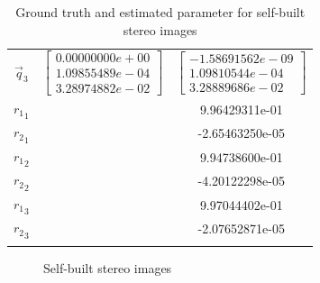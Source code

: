 \begin{table}[htbp]
\begin{tabular}{ccc}
		$\vec{q}_3$ & $ \begin{bmatrix} 0.00000000e+00\\
		1.09855489e-04 \\
		3.28974882e-02 \end{bmatrix}$ & $\begin{bmatrix} -1.58691562e-09\\
		1.09810544e-04 \\
		3.28889686e-02 \end{bmatrix}$ \\
		${r_1}_1$ & &9.96429311e-01\\
		\addlinespace[5pt]
		${r_2}_1$& &  -2.65463250e-05\\
		\addlinespace[5pt]
		${r_1}_2$ & &9.94738600e-01\\
		\addlinespace[5pt]
		${r_2}_2$& & -4.20122298e-05\\
		\addlinespace[5pt]
		${r_1}_3$ & &9.97044402e-01\\
		\addlinespace[5pt]
		${r_2}_3$& & -2.07652871e-05\\
		\addlinespace[5pt]
		\bottomrule
	\end{tabular}
	\caption{Ground truth and estimated parameter for self-built stereo images}  
	\label{tab:Ground Truth and Estimated Parameter for self-built Stereo Images} 
\end{table}

\begin{figure}[tbp]
	\centering
	 \quad
	\caption{Self-built stereo images}
	\label{fig:Self-built Stereo Images}
\end{figure}

